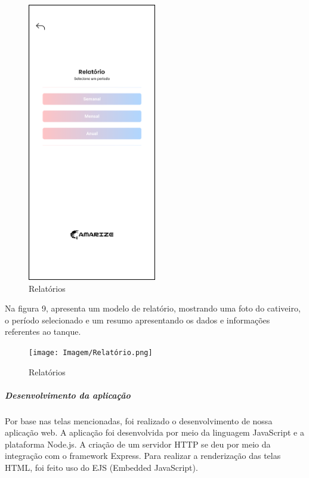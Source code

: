 \begin{figure}[!htb]
    \centering
    \caption{Relatórios}%
    \label{fig:relatório}
    \includegraphics[width = 0.5\textwidth]{Imagem/Opções_Relatório.png}
\end{figure}
    
\newpage

Na figura 9, apresenta um modelo de relatório, mostrando uma foto do cativeiro, o período selecionado e um resumo apresentando os dados e informações referentes ao tanque.

\begin{figure}[!htb]
    \centering
    \caption{Relatórios}%
    \label{fig:exemplo_relatório}
    \texttt{[image: Imagem/Relatório.png]}
\end{figure}
    
\newpage

\subparagraph*{\textbf{Desenvolvimento da aplicação}}

Por base nas telas mencionadas, foi realizado o desenvolvimento de nossa aplicação web. A aplicação foi desenvolvida por meio da linguagem JavaScript e a plataforma Node.js. A criação de um servidor HTTP se deu por meio da integração com o framework Express. Para realizar a renderização das telas HTML, foi feito uso do EJS (Embedded JavaScript).

